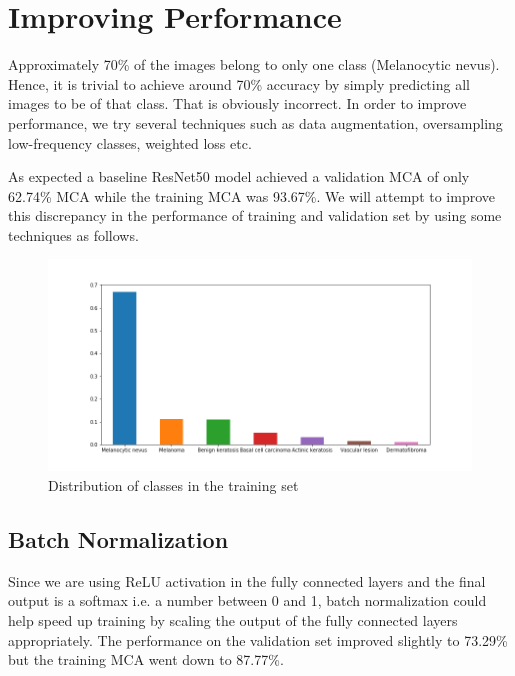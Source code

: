 \documentclass[conference]{IEEEtran}
\begin{document}
    \section{Improving Performance}\label{improving-performance}

Approximately 70\% of the images belong to only one class (Melanocytic
nevus). Hence, it is trivial to achieve around 70\% accuracy by simply
predicting all images to be of that class. That is obviously incorrect.
In order to improve performance, we try several techniques such as data
augmentation, oversampling low-frequency classes, weighted loss etc.

As expected a baseline ResNet50 model achieved a validation MCA of only 62.74\% MCA while the
training MCA was 93.67\%. We will attempt to improve this discrepancy in
the performance of training and validation set by using some techniques
as follows.

\begin{figure}[htbp]
\centerline{\includegraphics[width=\columnwidth]{Task3-DiseaseTypeFrequency.png}}
\caption{Distribution of classes in the training set }
\label{fig2}
\end{figure}



    \subsection{Batch Normalization}\label{batch-normalization}

Since we are using ReLU activation in the fully connected layers and
the final output is a softmax i.e. a number between 0 and 1, batch
normalization \cite{ioffe2015batch} could help speed up training by scaling the
output of the fully connected layers appropriately. The performance on
the validation set improved slightly to 73.29\% but the training MCA
went down to 87.77\%.
\end{document}
